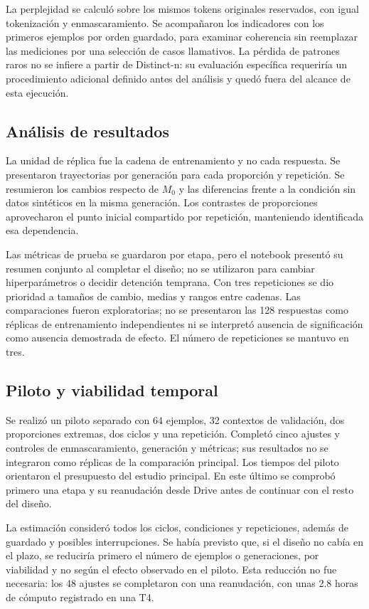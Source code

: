 \documentclass[12pt,letterpaper]{article}
\begin{document}
La perplejidad se calculó sobre los mismos tokens originales reservados,
con igual tokenización y enmascaramiento. Se acompañaron los indicadores
con los primeros ejemplos por orden guardado, para examinar coherencia
sin reemplazar las mediciones por una selección de casos llamativos.
La pérdida de patrones raros no se infiere a partir de Distinct-n: su
evaluación específica requeriría un procedimiento adicional definido antes
del análisis y quedó fuera del alcance de esta ejecución.

\subsection{Análisis de resultados}

La unidad de réplica fue la cadena de entrenamiento y no cada respuesta.
Se presentaron trayectorias por generación para cada proporción y
repetición. Se resumieron los cambios respecto de \(M_0\) y las diferencias
frente a la condición sin datos sintéticos en la misma generación.
Los contrastes de proporciones aprovecharon el punto inicial compartido
por repetición, manteniendo identificada esa dependencia.

Las métricas de prueba se guardaron por etapa, pero el notebook presentó
su resumen conjunto al completar el diseño; no se utilizaron para cambiar
hiperparámetros o decidir detención temprana. Con tres repeticiones se dio
prioridad a tamaños de cambio, medias y
rangos entre cadenas. Las comparaciones fueron exploratorias; no se
presentaron las 128 respuestas como réplicas de entrenamiento independientes
ni se interpretó ausencia de significación como ausencia demostrada
de efecto. El número de repeticiones se mantuvo en tres.

\subsection{Piloto y viabilidad temporal}

Se realizó un piloto separado con 64 ejemplos, 32 contextos de validación,
dos proporciones extremas, dos ciclos y una repetición. Completó cinco
ajustes y controles de enmascaramiento, generación y métricas; sus
resultados no se integraron como réplicas de la comparación principal.
Los tiempos del piloto orientaron el presupuesto
del estudio principal. En este último se comprobó primero una etapa y su
reanudación desde Drive antes de continuar con el resto del diseño.

La estimación consideró todos los ciclos, condiciones y repeticiones,
además de guardado y posibles interrupciones. Se había previsto que, si el
diseño no cabía en el plazo, se reduciría primero el número de ejemplos o
generaciones, por viabilidad y no según el efecto observado en el piloto.
Esta reducción no fue necesaria: los 48 ajustes se completaron con una reanudación, con unas 2.8 horas de cómputo registrado en una T4.
\end{document}
